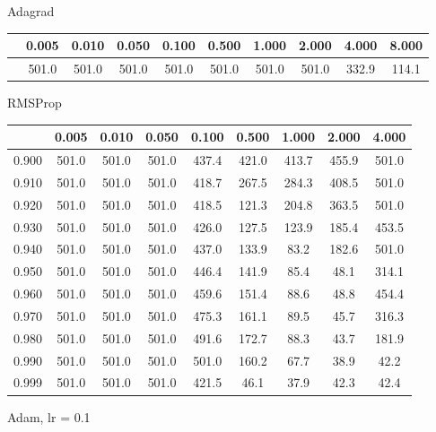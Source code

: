 \documentclass[a4paper,14pt,oneside,openany]{memoir}
\begin{document}
	Adagrad 
	
	\begin{tabular}{|c|c|c|c|c|c|c|c|c|c|}
	\hline 
	 &0.005 &0.010 &0.050 &0.100 &0.500 &1.000 &2.000 &4.000 &8.000 \\
	 \hline 
	 &501.0 &501.0 &501.0 &501.0 &501.0 &501.0 &501.0 &332.9 &114.1 \\
	 \hline 
	
	\end{tabular}
	
	RMSProp 
	
	\begin{tabular}{|c|c|c|c|c|c|c|c|c|}
	\hline 
	 &0.005 &0.010 &0.050 &0.100 &0.500 &1.000 &2.000 &4.000 \\
	 \hline 
	0.900 &501.0 &501.0 &501.0 &437.4 &421.0 &413.7 &455.9 &501.0 \\
	 \hline 
	0.910 &501.0 &501.0 &501.0 &418.7 &267.5 &284.3 &408.5 &501.0 \\
	 \hline 
	0.920 &501.0 &501.0 &501.0 &418.5 &121.3 &204.8 &363.5 &501.0 \\
	 \hline 
	0.930 &501.0 &501.0 &501.0 &426.0 &127.5 &123.9 &185.4 &453.5 \\
	 \hline 
	0.940 &501.0 &501.0 &501.0 &437.0 &133.9 &83.2 &182.6 &501.0 \\
	 \hline 
	0.950 &501.0 &501.0 &501.0 &446.4 &141.9 &85.4 &48.1 &314.1 \\
	 \hline 
	0.960 &501.0 &501.0 &501.0 &459.6 &151.4 &88.6 &48.8 &454.4 \\
	 \hline 
	0.970 &501.0 &501.0 &501.0 &475.3 &161.1 &89.5 &45.7 &316.3 \\
	 \hline 
	0.980 &501.0 &501.0 &501.0 &491.6 &172.7 &88.3 &43.7 &181.9 \\
	 \hline 
	0.990 &501.0 &501.0 &501.0 &501.0 &160.2 &67.7 &38.9 &42.2 \\
	 \hline 
	0.999 &501.0 &501.0 &501.0 &421.5 &46.1 &37.9 &42.3 &42.4 \\
	 \hline 
	
	\end{tabular}
	
	Adam, lr = 0.1 
	
\end{document}
